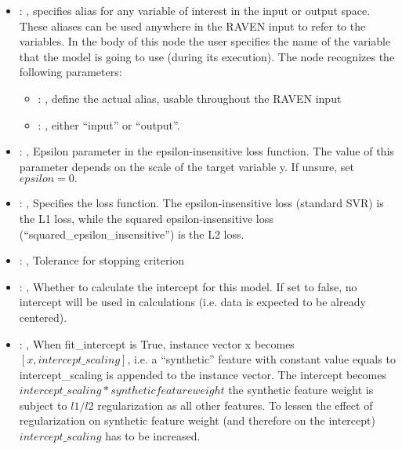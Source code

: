 \begin{itemize}
    \item {}: , 
      specifies alias for         any variable of interest in the input or output space. These
      aliases can be used anywhere in the RAVEN input to         refer to the variables. In the body
      of this node the user specifies the name of the variable that the model is going to use
      (during its execution).
      The  node recognizes the following parameters:
        \begin{itemize}
          \item {}: , 
            define the actual alias, usable throughout the RAVEN input
          \item {}: , 
            either ``input'' or ``output''.
      \end{itemize}

    \item {}: , 
      Epsilon parameter in the epsilon-insensitive loss function. The value of
      this parameter depends on the scale of the target variable y. If unsure, set $epsilon=0.$

    \item {}: , 
      Specifies the loss function. The epsilon-insensitive loss (standard SVR)
      is the L1 loss, while the squared epsilon-insensitive loss (``squared\_epsilon\_insensitive'')
      is the L2 loss.

    \item {}: , 
      Tolerance for stopping criterion

    \item {}: , 
      Whether to calculate the intercept for this model. If set to false, no
      intercept will be used in calculations (i.e. data is expected to be already centered).

    \item {}: , 
      When fit\_intercept is True, instance vector x becomes $[x, intercept\_scaling]$,
      i.e. a “synthetic” feature with constant value equals to intercept\_scaling is appended
      to the instance vector. The intercept becomes $intercept\_scaling * synthetic feature weight$
      \nb the synthetic feature weight is subject to $l1/l2$ regularization as all other features.
      To lessen the effect of regularization on synthetic feature weight (and therefore on the
      intercept)                                                  $intercept\_scaling$ has to be
      increased.


\end{itemize}
